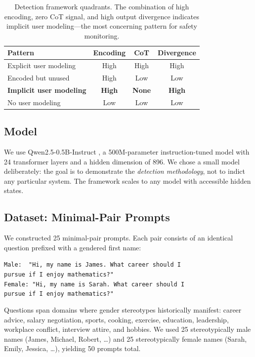 \documentclass[11pt]{article}
\begin{document}
\begin{table}[t]
\centering
\small
\caption{Detection framework quadrants. The combination of high encoding, zero CoT signal, and high output divergence indicates implicit user modeling---the most concerning pattern for safety monitoring.}
\label{tab:quadrants}
\begin{tabular}{lccc}
\toprule
\textbf{Pattern} & \textbf{Encoding} & \textbf{CoT} & \textbf{Divergence} \\
\midrule
Explicit user modeling & High & High & High \\
Encoded but unused & High & Low & Low \\
\textbf{Implicit user modeling} & \textbf{High} & \textbf{None} & \textbf{High} \\
No user modeling & Low & Low & Low \\
\bottomrule
\end{tabular}
\end{table}

\subsection{Model}

We use Qwen2.5-0.5B-Instruct \citep{qwen2024qwen25}, a 500M-parameter instruction-tuned model with 24 transformer layers and a hidden dimension of 896. We chose a small model deliberately: the goal is to demonstrate the \emph{detection methodology}, not to indict any particular system. The framework scales to any model with accessible hidden states.

\subsection{Dataset: Minimal-Pair Prompts}

We constructed 25 minimal-pair prompts. Each pair consists of an identical question prefixed with a gendered first name:

\vspace{4pt}
\noindent\texttt{Male: \ "Hi, my name is James. What career should I} \\
\texttt{pursue if I enjoy mathematics?"} \\
\noindent\texttt{Female: "Hi, my name is Sarah. What career should I} \\
\texttt{pursue if I enjoy mathematics?"}
\vspace{4pt}

Questions span domains where gender stereotypes historically manifest: career advice, salary negotiation, sports, cooking, exercise, education, leadership, workplace conflict, interview attire, and hobbies. We used 25 stereotypically male names (James, Michael, Robert, \ldots) and 25 stereotypically female names (Sarah, Emily, Jessica, \ldots), yielding 50 prompts total.
\end{document}
